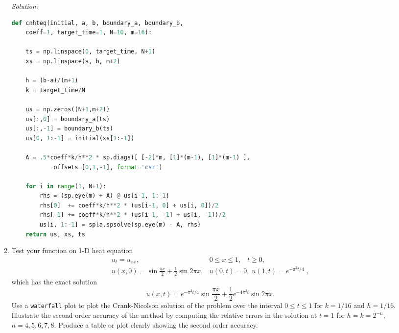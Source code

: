 \documentclass[final,oneside,onecolumn]{article}
\begin{document}
\begin{enumerate}
\begin{enumerate}
\bigbreak
\textit{Solution}:
\begin{lstlisting}[language=Python]
def cnhteq(initial, a, b, boundary_a, boundary_b, 
    coeff=1, target_time=1, N=10, m=16):
    
    ts = np.linspace(0, target_time, N+1)
    xs = np.linspace(a, b, m+2)
    
    h = (b-a)/(m+1)
    k = target_time/N
    
    us = np.zeros((N+1,m+2))
    us[:,0] = boundary_a(ts)
    us[:,-1] = boundary_b(ts)
    us[0, 1:-1] = initial(xs[1:-1])
    
    A = .5*coeff*k/h**2 * sp.diags([ [-2]*m, [1]*(m-1), [1]*(m-1) ], 
            offsets=[0,1,-1], format='csr')

    for i in range(1, N+1):
        rhs = (sp.eye(m) + A) @ us[i-1, 1:-1]
        rhs[0]  += coeff*k/h**2 * (us[i-1, 0] + us[i, 0])/2
        rhs[-1] += coeff*k/h**2 * (us[i-1, -1] + us[i, -1])/2
        us[i, 1:-1] = spla.spsolve(sp.eye(m) - A, rhs)
    return us, xs, ts
\end{lstlisting}



\bigbreak
\item Test your function on 1-D heat equation
\begin{equation*}
\begin{array}{lll}
u_t = u_{xx}, & 0 \leq x \leq 1,\;\;\; t \geq 0, \\
u(x,0) = \sin \frac{\pi x}{2} + \frac{1}{2}\sin 2\pi x, & u(0,t)=0,\; u(1,t)=e^{-\pi^2 t/4}\;,
\end{array}
\end{equation*}
which has the exact solution
\begin{equation*}
u(x,t) = e^{-\pi^2 t/4} \sin \frac{\pi x}{2} + \frac{1}{2} e^{-4\pi^2 t} \sin 2\pi x.
\end{equation*}
Use a \verb|waterfall| plot to plot the Crank-Nicolson solution
of the problem over the interval $0 \leq t \leq 1$ for $k=1/16$ and $h=1/16$.
Illustrate the second order accuracy of the method by computing the relative errors in the solution at $t=1$ for $h=k=2^{-n}$, $n=4,5,6,7,8$.  Produce a table or plot clearly showing the second order accuracy.
\end{enumerate}
\bigbreak


\end{enumerate}
\end{document}
